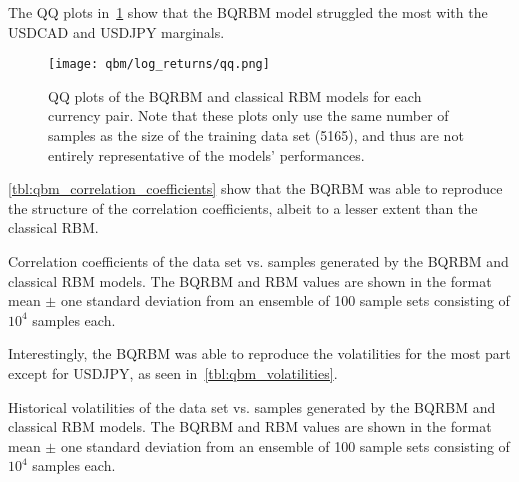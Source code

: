 The QQ plots in~\cref{fig:qbm_log_returns_qq} show that the BQRBM model struggled the most with the USDCAD and USDJPY marginals.
\begin{figure}[!htb]
    \begin{center}
        \texttt{[image: qbm/log\_returns/qq.png]}
    \end{center}
    \caption{QQ plots of the BQRBM and classical RBM models for each currency pair. Note that these plots only use the same number of samples as the size of the training data set (5165), and thus are not entirely representative of the models' performances.}
    \label{fig:qbm_log_returns_qq}
\end{figure}

\cref{tbl:qbm_correlation_coefficients} show that the BQRBM was able to reproduce the structure of the correlation coefficients, albeit to a lesser extent than the classical RBM.
\begin{table}[!htb]
    \centering
    \begin{adjustbox}{max width=\textwidth}
        
    \end{adjustbox}
    \caption{Correlation coefficients of the data set vs. samples generated by the BQRBM and classical RBM models. The BQRBM and RBM values are shown in the format mean \(\pm\) one standard deviation from an ensemble of 100 sample sets consisting of \( 10^4 \) samples each.}
    \label{tbl:qbm_correlation_coefficients}
\end{table}

Interestingly, the BQRBM was able to reproduce the volatilities for the most part except for USDJPY, as seen in~\cref{tbl:qbm_volatilities}.
\begin{table}[!htb]
    \centering
    \begin{adjustbox}{max width=\textwidth}
        
    \end{adjustbox}
    \caption{
        Historical volatilities of the data set vs. samples generated by the BQRBM and classical RBM models.
        The BQRBM and RBM values are shown in the format mean \(\pm\) one standard deviation from an ensemble of 100 sample sets consisting of \( 10^4 \) samples each.
    }
    \label{tbl:qbm_volatilities}
\end{table}

